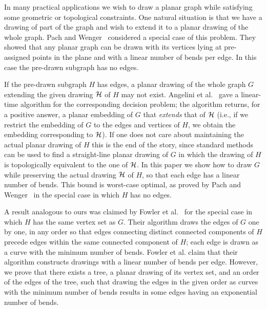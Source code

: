 \documentclass{llncs}
\begin{document}
In many practical applications we wish to draw a planar graph while satisfying some geometric or topological constraints. One natural situation is that we have a drawing of part of the graph and wish to extend it to a planar drawing of the whole graph. Pach and Wenger~\cite{PW01} considered a special case of this problem.  They showed that any planar graph can be drawn with its vertices lying at pre-assigned points in the plane and with a linear number of bends per edge. In this case the pre-drawn subgraph has no edges.

If the pre-drawn subgraph $H$ has edges, a planar drawing of the whole graph $G$ extending the given drawing $\cal H$ of $H$ may not exist. Angelini et al.~\cite{ABFJKPR10} gave a linear-time algorithm for the corresponding decision problem; the algorithm returns, for a positive answer, a planar embedding of $G$ that {\em extends} that of $\cal H$ (i.e., if we restrict the embedding of $G$ to the edges and vertices of $H$, we obtain the embedding corresponding to $\cal H$). If one does not care about maintaining the actual planar drawing of $H$ this is the end of the story, since standard methods can be used to find a straight-line planar drawing of $G$ in which the drawing of $H$ is topologically equivalent to the one of $\cal H$. In this paper we show how to draw $G$ while preserving the actual drawing $\cal H$ of $H$, so that each edge has a linear number of bends. This bound is worst-case optimal, as proved by Pach and Wenger~\cite{PW01} in the special case in which $H$ has no edges.

A result analogous to ours was claimed by Fowler et al.~\cite{fjks-crp-11} for the special case in which $H$ has the same vertex set as $G$. Their algorithm draws the edges of $G$ one by one, in any order so that edges connecting distinct connected components of $H$ precede edges within the same connected component of $H$; each edge is drawn as a curve with the minimum number of bends. Fowler et al. claim that their algorithm constructs drawings with a linear number of bends per edge. However, we prove that there exists a tree, a planar drawing of its vertex set, and an order of the edges of the tree, such that drawing the edges in the given order as curves with the minimum number of bends results in some edges having an exponential number of bends.
\end{document}

